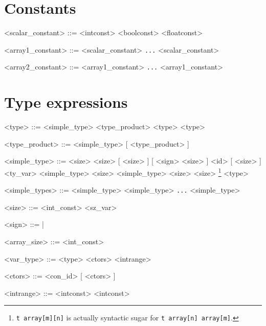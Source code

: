 \section*{Constants}

\begin{grammar}
<scalar_constant> ::= <intconst>
                    \alt <boolconst>
                    \alt <floatconst>

<array1_constant> ::= \lit{[} <scalar_constant> \lit{,} \texttt{...} \lit{,} <scalar_constant> \lit{]}

<array2_constant> ::= \lit{[} <array1_constant> \lit{,} \texttt{...} \lit{,} <array1_constant> \lit{]}
\end{grammar}

\section*{Type expressions}

\begin{grammar}
<type> ::= <simple_type>
         \alt <type_product>
         \alt <type> \lit{\texttt{->}} <type>

<type_product> ::= <simple_type> [ \lit{*} <type_product> ]

<simple_type> ::=  \lit{\verb|<|} <size> \lit{\verb|>|}
                \alt {} \lit{\verb|<|} <size> \lit{\verb|>|}
                \alt {}
                \alt {} [\lit{\verb|<|} <size> \lit{\verb|>|}]
                \alt {} [\lit{\verb|<|} <sign> \lit{,} <size> \lit{\verb|>|}]
                 <id> [\lit{\verb|<|} <size> \lit{\verb|>|}]
                \alt <ty_var>
                \alt <simple_type>  \lit{[} <size> \lit{]}
                \alt <simple_type>  \lit{[} <size> \lit{]} \lit{[} <size>
                \lit{]}\footnote{\texttt{t array[m][n]} is actually syntactic sugar for \texttt{t
                    array[n] array[m]}.}
                \alt \lit{(} <type> \lit{)}
    
<simple_types> ::= <simple_type>
                 \alt \lit{(} <simple_type> \lit{,} \texttt{...} \lit{,} <simple_type> \lit{)}

<size> ::= <int_const>
             \alt <sz_var>

<sign>   ::=  | 

<array_size> ::= <int_const>

<var_type> ::= <type>
             \alt \lit{\{} <ctors> \lit{\}}      %
             \alt \lit{\{} <intrange> \lit{\}}   

<ctors> ::= <con_id> [ \lit{,} <ctors> ]

<intrange> ::= <intconst>   <intconst>
\end{grammar}

